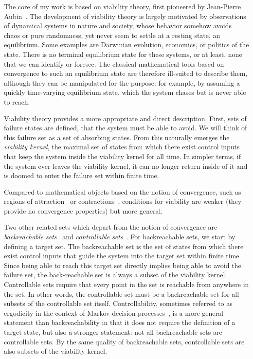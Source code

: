 The core of my work is based on viability theory, first pioneered by Jean-Pierre Aubin~\cite{aubin2011viability}. The development of viability theory is largely motivated by observations of dynamical systems in nature and society, whose behavior somehow avoids chaos or pure randomness, yet never seem to settle at a resting state, an equilibrium.
Some examples are Darwinian evolution, economics, or politics of the state. There is no terminal equilibrium state for these systems, or at least, none that we can identify or foresee.
The classical mathematical tools based on convergence to such an equilibrium state are therefore ill-suited to describe them, although they can be manipulated for the purpose: for example, by assuming a quickly time-varying equilibrium state, which the system chases but is never able to reach. \par
Viability theory provides a more appropriate and direct description. First, sets of failure states are defined, that the system must be able to avoid. We will think of this failure set as a set of absorbing states. From this naturally emerges the \emph{viability kernel}, the maximal set of states from which there exist control inputs that keep the system inside the viability kernel for all time. In simpler terms, if the system ever leaves the viability kernel, it can no longer return inside of it and is doomed to enter the failure set within finite time. \par
Compared to mathematical objects based on the notion of convergence, such as regions of attraction~\cite[(section 6.4)]{strogatz2018nonlinear} or contractions~\cite{bazzi2018stability}, conditions for viability are weaker (they provide no convergence properties) but more general. \par
Two other related sets which depart from the notion of convergence are \emph{backreachable sets}~\cite{bansal2017hamilton} and \emph{controllable sets}~\cite{zaytsev2018boundaries}. For backreachable sets, we start by defining a target set.
The backreachable set is the set of states from which there exist control inputs that guide the system into the target set within finite time.
Since being able to reach this target set directly implies being able to avoid the failure set, the back-reachable set is always a subset of the viability kernel.
Controllable sets require that every point in the set is reachable from anywhere in the set. In other words, the controllable set must be a backreachable set for all subsets of the controllable set itself. Controllability, sometimes referred to as ergodicity in the context of Markov decision processes~\cite{moldovan2012safemdp}, is a more general statement than backreachability in that it does not require the definition of a target state, but also a stronger statement: not all backreachable sets are controllable sets. By the same quality of backreachable sets, controllable sets are also subsets of the viability kernel. \par
